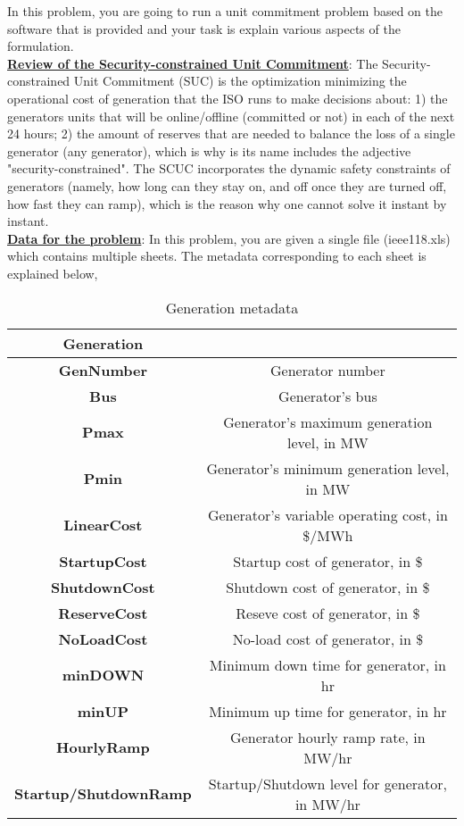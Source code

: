 \documentclass[11pt]{exam}
\begin{document}
\clearpage
\noindent In this problem, you are going to run a unit commitment problem based on the software that is provided and your task is explain various aspects of the formulation. 
\\[0.1cm]
\underline{\bf Review of the Security-constrained Unit Commitment}: The Security-constrained Unit Commitment (SUC) is the optimization minimizing the operational cost of generation that the ISO runs to make decisions about: 1) the generators units that will be online/offline (committed or not) in each of the next 24 hours; 2) the amount of reserves that are needed to balance the loss of a single generator (any generator), which is why is its name includes the adjective "security-constrained". The SCUC incorporates the dynamic safety constraints of generators (namely, how long can they stay on, and off once they are turned off, how fast they can ramp), which is the reason why one cannot solve it instant by instant. 
\\[0.1cm]
\underline{\bf Data for the problem}:  In this problem, you are given a single file (ieee118.xls) which contains multiple sheets. The metadata corresponding to each sheet is explained below,
\vspace{-0.5cm}
\begin{table}[!htbp]
\centering
\caption{Generation metadata}
\begin{tabular}{@{}cc@{}}
\toprule
\textbf{Generation}           &                                                \\ \midrule
\textbf{GenNumber}            & Generator number                               \\
\textbf{Bus}                  & Generator's bus                                \\
\textbf{Pmax}                 & Generator's maximum generation level, in MW    \\
\textbf{Pmin}                 & Generator's minimum generation level, in MW    \\
\textbf{LinearCost}           & Generator's variable operating cost, in \$/MWh \\
\textbf{StartupCost}          & Startup cost of generator, in \$               \\
\textbf{ShutdownCost}         & Shutdown cost of generator, in \$              \\
\textbf{ReserveCost}          & Reseve cost of generator, in \$                \\
\textbf{NoLoadCost}           & No-load cost of generator, in \$               \\
\textbf{minDOWN}              & Minimum down time for generator, in hr         \\
\textbf{minUP}                & Minimum up time for generator, in hr           \\
\textbf{HourlyRamp}           & Generator hourly ramp rate, in MW/hr           \\
\textbf{Startup/ShutdownRamp} & Startup/Shutdown level for generator, in MW/hr \\ \bottomrule
\end{tabular}
\end{table}
\end{document}
